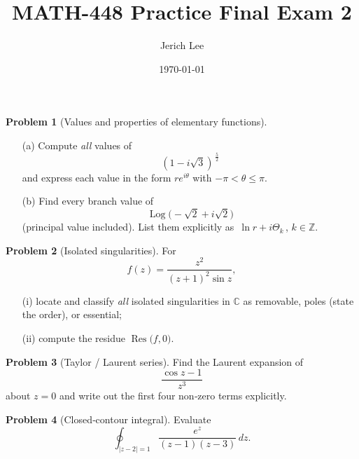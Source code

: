 \documentclass[12pt]{article}
\title{MATH-448 Practice Final Exam 2}
\author{Jerich Lee}
\date{\today}
\DeclareMathOperator{\Log}{Log}
\theoremstyle{definition} %
\newtheorem{problem}{Problem}
\theoremstyle{plain} %
\begin{document}
\maketitle
\pagebreak
\begin{problem}[Values and properties of elementary functions]
  \begin{enumerate}
    \item[(a)] Compute \emph{all} values of 
      \[
        (1-i\sqrt{3})^{\,\tfrac52}
      \]
      and express each value in the form $re^{i\theta}$ with
      $-\pi<\theta\le\pi$.
    \item[(b)] Find every branch value of 
      \[
        \Log\!\bigl(-\sqrt{2}+i\sqrt{2}\bigr)
      \]
      (principal value included).  List them explicitly as
      $\,\ln r + i\Theta_k\,$, $k\in\mathbb{Z}$.
  \end{enumerate}
  \end{problem}
  
  \pagebreak
  \begin{problem}[Isolated singularities]
  For 
  \[
    f(z)=\frac{z^{2}}{(z+1)^{2}\sin z},
  \]
  \begin{enumerate}
    \item[(i)] locate and classify \emph{all} isolated singularities
          in $\mathbb{C}$ as removable, poles (state the order),
          or essential;
    \item[(ii)] compute the residue $\operatorname{Res}\!\bigl(f,0\bigr)$.
  \end{enumerate}
  \end{problem}
  
  \pagebreak
  \begin{problem}[Taylor / Laurent series]
  Find the Laurent expansion of
  \[
    \frac{\cos z-1}{z^{3}}
  \]
  about $z=0$ and write out the first four non‑zero terms explicitly.
  \end{problem}
  
  \pagebreak
  \begin{problem}[Closed‑contour integral]
  Evaluate
  \[
    \oint_{\lvert z-2\rvert = 1}
          \frac{e^{z}}{(z-1)(z-3)}\,dz .
  \]
  \end{problem}
  
\end{document}
